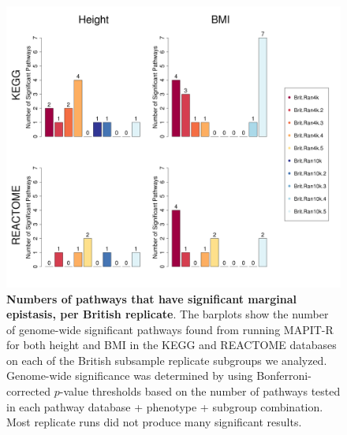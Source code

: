 \documentclass[12pt,a4paper]{article}
\begin{document}
\addtocounter{figure}{1}
\renewcommand{\thefigure}{\arabic{figure}}

\begin{figure}[htbp]
\centering
\hspace*{-1.75cm}
\includegraphics[scale=.45]{Images/Supp/InterPath_Supp_Figure_BritReps_Barplot_vs4.png}
\caption[TBD]{\textbf{Numbers of pathways that have significant marginal epistasis, per British replicate}. The barplots show the number of genome-wide significant pathways found from running MAPIT-R for both height and BMI in the KEGG and REACTOME databases on each of the British subsample replicate subgroups we analyzed. Genome-wide significance was determined by using Bonferroni-corrected $p$-value thresholds based on the number of pathways tested in each pathway database + phenotype + subgroup combination. Most replicate runs did not produce many significant results.}
\label{InterPath-Supp-Figure-BritReps-Barplots}
\end{figure}
\clearpage
\end{document}

